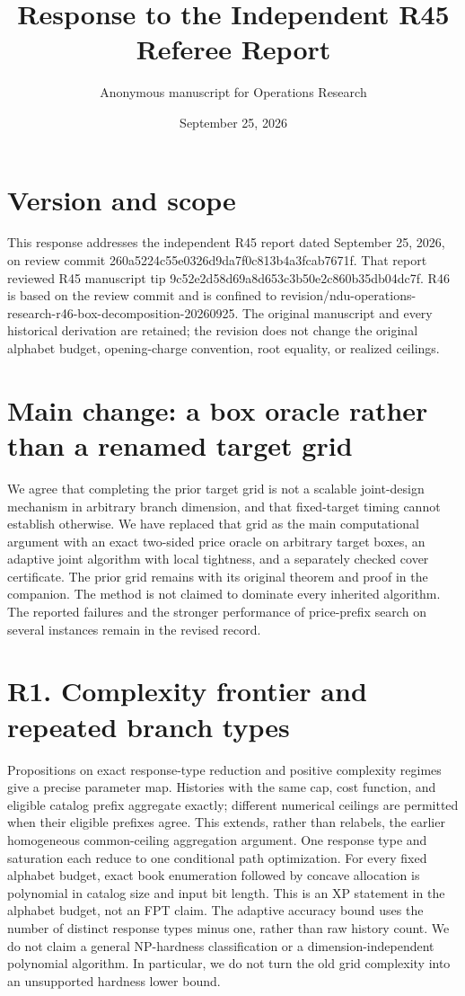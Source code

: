 \documentclass[11pt,letterpaper]{article}
\title{Response to the Independent R45 Referee Report}
\author{Anonymous manuscript for Operations Research}
\date{September 25, 2026}
\begin{document}
\maketitle
\section*{Version and scope}
This response addresses the independent R45 report dated September 25, 2026, on review commit 260a5224c55e0326d9da7f0c813b4a3fcab7671f. That report reviewed R45 manuscript tip 9c52e2d58d69a8d653c3b50e2c860b35db04dc7f. R46 is based on the review commit and is confined to revision/ndu-operations-research-r46-box-decomposition-20260925. The original manuscript and every historical derivation are retained; the revision does not change the original alphabet budget, opening-charge convention, root equality, or realized ceilings.

\section*{Main change: a box oracle rather than a renamed target grid}
We agree that completing the prior target grid is not a scalable joint-design mechanism in arbitrary branch dimension, and that fixed-target timing cannot establish otherwise. We have replaced that grid as the main computational argument with an exact two-sided price oracle on arbitrary target boxes, an adaptive joint algorithm with local tightness, and a separately checked cover certificate. The prior grid remains with its original theorem and proof in the companion. The method is not claimed to dominate every inherited algorithm. The reported failures and the stronger performance of price-prefix search on several instances remain in the revised record.

\section*{R1. Complexity frontier and repeated branch types}
Propositions on exact response-type reduction and positive complexity regimes give a precise parameter map. Histories with the same cap, cost function, and eligible catalog prefix aggregate exactly; different numerical ceilings are permitted when their eligible prefixes agree. This extends, rather than relabels, the earlier homogeneous common-ceiling aggregation argument. One response type and saturation each reduce to one conditional path optimization. For every fixed alphabet budget, exact book enumeration followed by concave allocation is polynomial in catalog size and input bit length. This is an XP statement in the alphabet budget, not an FPT claim. The adaptive accuracy bound uses the number of distinct response types minus one, rather than raw history count. We do not claim a general NP-hardness classification or a dimension-independent polynomial algorithm. In particular, we do not turn the old grid complexity into an unsupported hardness lower bound.
\end{document}
